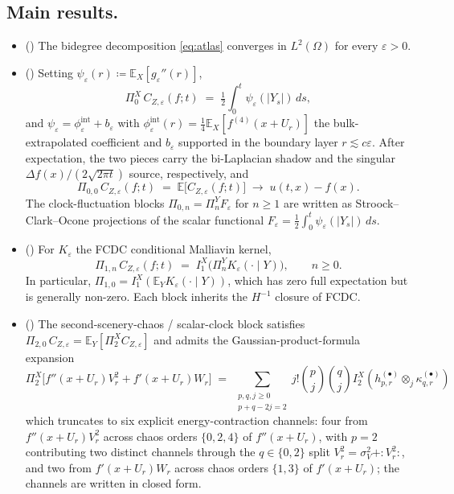 \documentclass[11pt,reqno]{amsart}
\theoremstyle{plain}
\theoremstyle{definition}
\theoremstyle{remark}
\newcommand{\E}{\mathbb{E}}
\newcommand{\IBM}{Z}
\newcommand{\Pir}{\Pi}
\begin{document}
\subsection*{Main results.}
\begin{itemize}
\item[\textbf{(A)}] () The bidegree decomposition
\eqref{eq:atlas} converges in $L^{2}(\Omega)$ for every
$\varepsilon>0$.

\item[\textbf{(B)}] () Setting
$\psi_\varepsilon(r)\coloneqq\E_X[g_\varepsilon''(r)]$,
\[
 \Pir_0^X\,C_{\IBM,\varepsilon}(f;t)
 \;=\;\tfrac12\!\int_0^t\!\psi_\varepsilon(|Y_s|)\,ds,
\]
and $\psi_\varepsilon=\phi_\varepsilon^{\mathrm{int}}+b_\varepsilon$ with
$\phi_\varepsilon^{\mathrm{int}}(r)=\tfrac14\E_X[f^{(4)}(x+U_r)]$ the
bulk-extrapolated coefficient and $b_\varepsilon$ supported in the
boundary layer $r\lesssim c\varepsilon$. After expectation, the two
pieces carry the bi-Laplacian shadow and the singular
$\Delta f(x)/(2\sqrt{2\pi t})$ source, respectively, and
\[
 \Pir_{0,0}\,C_{\IBM,\varepsilon}(f;t)
 \;=\;\E\bigl[C_{\IBM,\varepsilon}(f;t)\bigr]
 \;\longrightarrow\;u(t,x)-f(x).
\]
The clock-fluctuation blocks $\Pir_{0,n}=\Pir_n^Y F_\varepsilon$ for
$n\ge 1$ are written as Stroock--Clark--Ocone projections of the
scalar functional $F_\varepsilon=\tfrac12\!\int_0^t\psi_\varepsilon(|Y_s|)\,ds$.

\item[\textbf{(C)}] () For
$K_\varepsilon$ the FCDC conditional Malliavin kernel,
\[
 \Pir_{1,n}\,C_{\IBM,\varepsilon}(f;t)
 \;=\;I_1^X\!\bigl(\Pir_n^Y K_\varepsilon(\cdot\mid Y)\bigr),
 \qquad n\ge 0.
\]
In particular, $\Pir_{1,0}=I_1^X(\E_Y K_\varepsilon(\cdot\mid Y))$,
which has zero full expectation but is generally non-zero. Each block
inherits the $H^{-1}$ closure of FCDC.

\item[\textbf{(D)}] () The second-scenery-chaos /
scalar-clock block satisfies
$\Pir_{2,0}\,C_{\IBM,\varepsilon}=\E_Y[\Pir_2^X C_{\IBM,\varepsilon}]$
and admits the Gaussian-product-formula expansion
\[
 \Pir_2^X\bigl[f''(x+U_r)V_r^2+f'(x+U_r)W_r\bigr]
 \;=\;\sum_{\substack{p,q,j\ge 0\\p+q-2j=2}}\!\!\!j!\binom{p}{j}\binom{q}{j}
   I_2^X(h^{(\bullet)}_{p,r}\otimes_j \kappa^{(\bullet)}_{q,r})
\]
which truncates to six explicit energy-contraction channels: four
from $f''(x+U_r)V_r^2$ across chaos orders $\{0,2,4\}$ of
$f''(x+U_r)$, with $p=2$ contributing two distinct channels through
the $q\in\{0,2\}$ split $V_r^2=\sigma_V^2+{:}V_r^2{:}$, and two from
$f'(x+U_r)W_r$ across chaos orders $\{1,3\}$ of $f'(x+U_r)$; the
channels are written in closed form.
\end{itemize}
\end{document}
